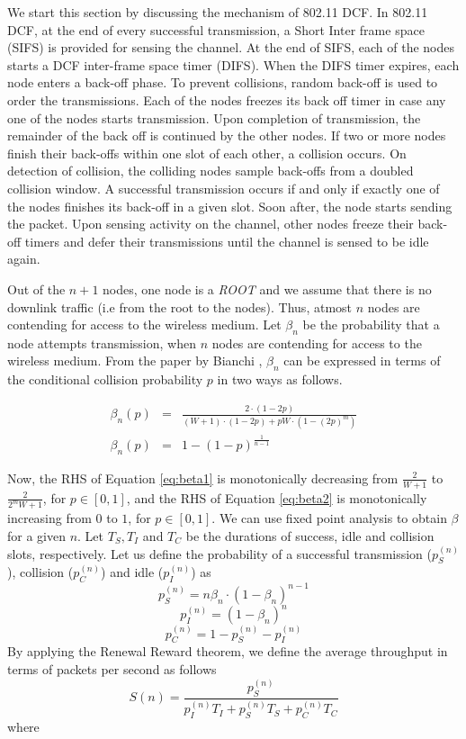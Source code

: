 \documentclass[10pt, conference, compsocconf]{IEEEtran}
\begin{document}
We start this section by discussing the mechanism of 802.11 DCF. In 802.11 DCF, at the end of every successful transmission, a Short Inter frame space (SIFS) is provided for sensing the channel. At the end of SIFS, each of the nodes starts a DCF inter-frame space timer (DIFS). When the DIFS timer expires, each node enters a back-off phase. To prevent collisions, random back-off is used to order the transmissions. Each of the nodes freezes its back off timer in case any one of the nodes starts transmission. Upon completion of transmission, the remainder of the back off is continued by the other nodes. If two or more nodes finish their back-offs within one slot of each other, a collision occurs. On detection of collision, the colliding  nodes sample back-offs from a doubled collision window. A successful transmission occurs if and only if exactly one of the nodes finishes its back-off in a given slot. Soon after, the node starts sending the packet. Upon sensing activity on the channel, other nodes freeze their back-off timers and defer their transmissions until the channel is sensed to be idle again.

Out of the $n+1$ nodes, one node is a \textit{ROOT} and we assume that there is no downlink traffic (i.e from the root to the nodes). Thus, atmost $n$ nodes are contending for access to the wireless medium. Let $\beta_n$ be the probability that a node attempts transmission, when $n$ nodes are contending for access to the wireless medium. From the paper by Bianchi \cite{bianchi}, $\beta_n$ can be expressed in terms of the conditional collision probability $p$ in two ways as follows.

\begin{eqnarray}
\beta_n(p) &=& \frac{2 \cdot (1-2p)}{(W+1) \cdot (1-2p) + pW \cdot (1 - {(2p)}^m)} \label{eq:beta1} \\
\beta_n(p) &=& 1 - (1-p)^{\frac{1}{n-1}} \label{eq:beta2}
\end{eqnarray}


Now, the RHS of Equation \eqref{eq:beta1} is monotonically decreasing from $\frac{2}{W+1}$ to $\frac{2}{2^mW+1}$, for $p \in [0,1]$, and the RHS of Equation \eqref{eq:beta2} is monotonically increasing from $0$ to $1$, for $p \in [0,1]$. We can use fixed point analysis to obtain $\beta$ for a given $n$. Let $T_S, T_I$ and $T_C$ be the durations of success, idle and collision slots, respectively. Let us define the probability of a successful transmission ($p^{(n)}_S$), collision ($p^{(n)}_C$) and idle ($p^{(n)}_I$) as
$$ p^{(n)}_S = n\beta_n \cdot (1-\beta_n)^{n-1}$$
$$ p^{(n)}_I = (1-\beta_n)^n $$
$$ p^{(n)}_C = 1-  p^{(n)}_S - p^{(n)}_I$$	
By applying the Renewal Reward theorem, we define the average throughput in terms of packets per second as follows
$$S(n) = \frac{p^{(n)}_S}{p^{(n)}_IT_I + p^{(n)}_ST_S + p^{(n)}_CT_C}$$
where
\end{document}
